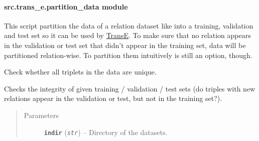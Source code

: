\documentclass[letterpaper,10pt,english]{sphinxmanual}
\begin{document}
\paragraph{src.trans\_e.partition\_data module}
\label{src.trans_e:src-trans-e-partition-data-module}\label{src.trans_e:module-src.trans_e.partition_data}
This script partition the data of a relation dataset like  into a training, validation and test set so it
can be used by \href{https://github.com/glorotxa/SME}{TransE}.
To make sure that no relation appears in the validation or test set that didn't appear in the training set, data
will be partitioned relation-wise. To partition them intuitively is still an option, though.

\begin{fulllineitems}
\label{src.trans_e:src.trans_e.partition_data.check_data_integrity}
Check whether all triplets in the data are unique.

\end{fulllineitems}


\begin{fulllineitems}
\label{src.trans_e:src.trans_e.partition_data.check_set_integrity}
Checks the integrity of given training / validation / test sets (do triples with new relations appear in the
validation or test, but not in the training set?).
\begin{quote}\begin{description}
\item[{Parameters}] \leavevmode
\textbf{\texttt{indir}} (\emph{\texttt{str}}) -- Directory of the datasets.

\end{description}\end{quote}

\end{fulllineitems}

\end{document}
